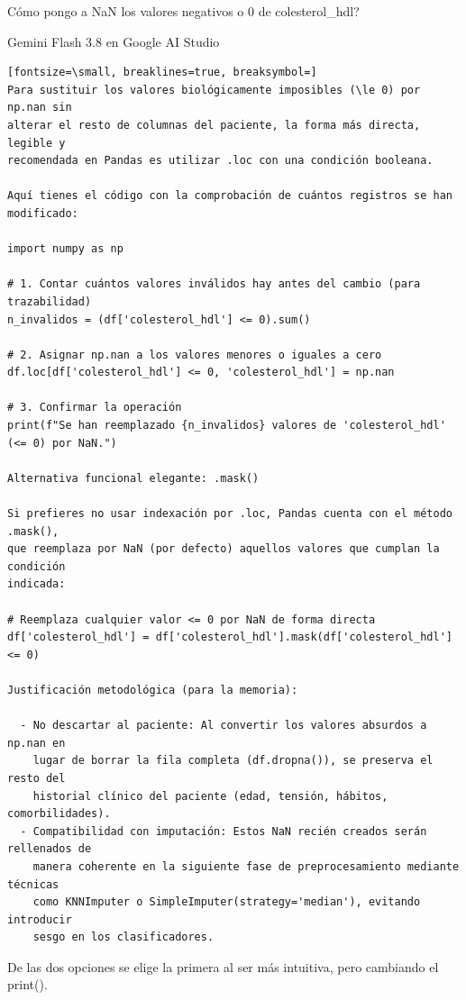 \documentclass[12pt,a4paper,oneside]{book}
\begin{document}
\begin{iaprompt}
Cómo pongo a NaN los valores negativos o 0 de colesterol_hdl?
\end{iaprompt}
\begin{iaresp}{Gemini Flash 3.8 en Google AI Studio}
\begin{Verbatim}[fontsize=\small, breaklines=true, breaksymbol=]
Para sustituir los valores biológicamente imposibles (\le 0) por np.nan sin
alterar el resto de columnas del paciente, la forma más directa, legible y
recomendada en Pandas es utilizar .loc con una condición booleana.

Aquí tienes el código con la comprobación de cuántos registros se han
modificado:

import numpy as np

# 1. Contar cuántos valores inválidos hay antes del cambio (para trazabilidad)
n_invalidos = (df['colesterol_hdl'] <= 0).sum()

# 2. Asignar np.nan a los valores menores o iguales a cero
df.loc[df['colesterol_hdl'] <= 0, 'colesterol_hdl'] = np.nan

# 3. Confirmar la operación
print(f"Se han reemplazado {n_invalidos} valores de 'colesterol_hdl' (<= 0) por NaN.")

Alternativa funcional elegante: .mask()

Si prefieres no usar indexación por .loc, Pandas cuenta con el método .mask(),
que reemplaza por NaN (por defecto) aquellos valores que cumplan la condición
indicada:

# Reemplaza cualquier valor <= 0 por NaN de forma directa
df['colesterol_hdl'] = df['colesterol_hdl'].mask(df['colesterol_hdl'] <= 0)

Justificación metodológica (para la memoria):

  - No descartar al paciente: Al convertir los valores absurdos a np.nan en
    lugar de borrar la fila completa (df.dropna()), se preserva el resto del
    historial clínico del paciente (edad, tensión, hábitos, comorbilidades).
  - Compatibilidad con imputación: Estos NaN recién creados serán rellenados de
    manera coherente en la siguiente fase de preprocesamiento mediante técnicas
    como KNNImputer o SimpleImputer(strategy='median'), evitando introducir
    sesgo en los clasificadores.
\end{Verbatim}
\end{iaresp}
\begin{iaanalisis}
De las dos opciones se elige la primera al ser más intuitiva, pero cambiando el print().
\end{iaanalisis}
\end{document}

